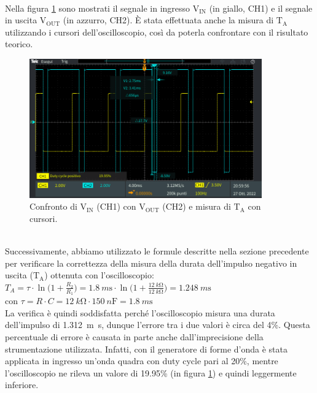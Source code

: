 \documentclass{report}
\begin{document}
\\Nella figura \ref{figura:TEK00002} sono mostrati il segnale in ingresso $\mathrm{V_{IN}}$ (in giallo, CH1) e il segnale in uscita $\mathrm{V_{OUT}}$ (in azzurro, CH2). \`E stata effettuata anche la misura di $\mathrm{T_A}$ utilizzando i cursori dell'oscilloscopio, così da poterla confrontare con il risultato teorico.
\begin{figure}[h!]
	\centering
	\includegraphics[height=6cm]{immagini/TEK00002}
	\caption{Confronto di $\mathrm{V_{IN}}$ (CH1) con $\mathrm{V_{OUT}}$ (CH2) e misura di $\mathrm{T_A}$ con cursori.}
	\label{figura:TEK00002}
\end{figure}
\\Successivamente, abbiamo utilizzato le formule descritte nella sezione precedente per verificare la correttezza della misura della durata dell'impulso negativo in uscita ($\mathrm{T_A}$) ottenuta con l'oscilloscopio:
\\[4pt]\indent$\displaystyle{T_A=\tau\cdot\ln\biggl(1+\frac{R_2}{R_1}\biggr)=\SI{1.8}{m\second}\cdot\ln\biggl(1+\frac{\SI{12}{k\ohm}}{\SI{12}{k\ohm}}\biggr)=\SI{1.248}{m\second}}$
\\[4pt]\indent con $\displaystyle{\tau=R \cdot C=\SI{12}{k\ohm}\cdot\SI{150}{n\farad}=\SI{1.8}{m\second}}$
\\[4pt]La verifica è quindi soddisfatta perché l'oscilloscopio misura una durata dell'impulso di \SI{1.312}{m\second}, dunque l'errore tra i due valori è circa del 4\%. Questa percentuale di errore è causata in parte anche dall'imprecisione  della strumentazione utilizzata. Infatti, con il generatore di forme d'onda è stata applicata in ingresso un'onda quadra con duty cycle pari al 20\%, mentre l'oscilloscopio ne rileva un valore di 19.95\% (in figura \ref{figura:TEK00002}) e quindi leggermente inferiore. %
\end{document}
